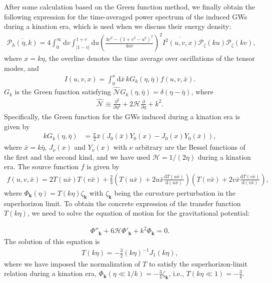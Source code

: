 \documentclass[superscriptaddress, aps, preprintnumbers,
amsmath, amssymb, sort&compress, nofootinbib, 10pt, paper, floatfix]{revtex4-2}
\newcommand{\dd}{\mathrm{d}}
\begin{document}
After some calculation based on the Green function method, we finally obtain the following expression for the time-averaged power spectrum of the induced GWs during a kination era, which is used when we discuss their energy density:
\begin{align}
        \overline{\mathcal P_h(\eta, k)} = 4 \int^\infty_0 \dd v \int^{1+v}_{|1-v|} \dd u \left( \frac{4v^2 - (1+v^2-u^2)^2}{4 u v} \right)^2 \overline {I^2(u,v,x)} \mathcal P_\zeta(k u) \mathcal P_\zeta(k v),
        \label{eq:p_h_uv}
\end{align}
where $x = k \eta$, the overline denotes the time average over oscillations of the tensor modes, and 
\begin{align}
  I(u,v,x) = \int^x_0 \dd \bar x\, k G_k(\eta, \bar \eta) f(u,v,\bar x).
  \label{eq:I_def}
\end{align}
$G_k$ is the Green function satisfying $\hat {\mathcal N} G_k(\eta,\bar \eta) = \delta (\eta - \bar \eta)$, where 
\begin{align}
        \hat{\mathcal N} \equiv \frac{\partial^2}{\partial \eta^2} + 2 \mathcal H \frac{\partial}{\partial \eta} + k^2.
\end{align}
Specifically, the Green function for the GWs induced during a kination era is given by 
\begin{align}
  k G_k(\eta,\bar \eta) &= \frac{\pi}{2} \bar x (J_0(\bar x) Y_0(x) - J_0(x) Y_0(\bar x)),
\end{align}
where $\bar x = k\bar \eta$, $J_\nu(x)$ and $Y_\nu(x)$ with $\nu$ arbitrary are the Bessel functions of the first and the second kind, and we have used $\mathcal H = 1/(2\eta)$ during a kination era. 
The source function $f$ is given by 
\begin{align}
        f(u,v,\bar x) = 2 T(u\bar{x})T(v\bar{x}) + \frac{2}{3} \left( T(u\bar{x}) + 2 u \bar x \frac{\dd T(u\bar{x})}{\dd (u \bar x)} \right) \left( T(v\bar{x}) + 2 v \bar x \frac{\dd T(v\bar{x})}{\dd (v \bar x)}\right),
\label{eq:f_def}
\end{align}
where $\Phi_{\bm k}(\eta) = T(k \eta) \zeta_{\bm k}$ with $\zeta_{\bm k}$ being the curvature perturbation in the superhorizon limit. 
To obtain the concrete expression of the transfer function $T(k\eta)$, we need to solve the equation of motion for the gravitational potential:

\begin{align}
        \Phi''_{\bm k} + 6\mathcal H \Phi'_{\bm k} + k^2 \Phi_{\bm k} = 0.
        \label{eq:phi_eom_w}
\end{align}
The solution of this equation is
\begin{align}
        T(k\eta) = -\frac{3}{2}(k \eta)^{-1} J_1 (k \eta),
        \label{eq:transfer_function_KD}
\end{align}
where we have imposed the normalization of $T$ to satisfy the superhorizon-limit relation during a kination era, $\Phi_{\bm k}(\eta \ll 1/k) = -\frac{3}{4}\zeta_{\bm k}$, i.e., $T(k\eta \ll 1) = - \frac{3}{4}$.
\end{document}
